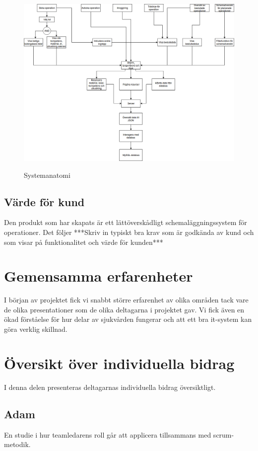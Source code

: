 \begin{figure}[H]
\includegraphics[width=\textwidth,height=.4\textheight]{Figures/Systemanatomi.png}\\
\caption{Systemanatomi}
\label{fig:Systemanatomi}
\end{figure}

\subsection{Värde för kund}
Den produkt som har skapats är ett lättöverskådligt schemaläggningssystem för operationer. Det följer ***Skriv in typiskt bra krav som är godkända av kund och som visar på funktionalitet och värde för kunden***

\section{Gemensamma erfarenheter}
I början av projektet fick vi snabbt större erfarenhet av olika områden
tack vare de olika presentationer som de olika deltagarna i projektet gav.
Vi fick även en ökad förståelse för hur delar av sjukvården fungerar och att ett bra
it-system kan göra verklig skillnad.

\section{Översikt över individuella bidrag}
I denna delen presenteras deltagarnas individuella bidrag översiktligt.

\subsection{Adam}
En studie i hur teamledarens roll går att applicera tillsammans med scrum-metodik.
